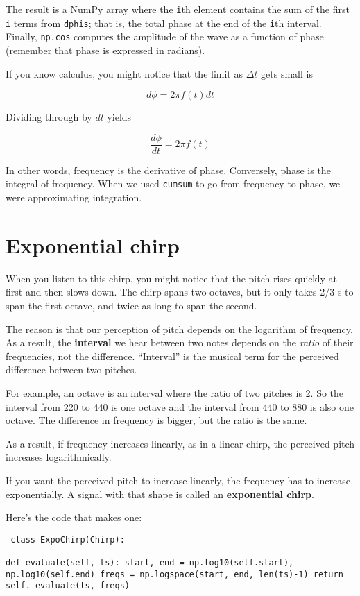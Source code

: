 \documentclass[12pt]{book} \usepackage[width=5.5in,height=8.5in, hmarginratio=3:2,vmarginratio=1:1]{geometry}
\begin{document}
The result is a NumPy array where the {\tt i}th element contains the sum of the first {\tt i} terms from {\tt dphis}; that is, the total phase at the end of the {\tt i}th interval. Finally, {\tt np.cos} computes the amplitude of the wave as a function of phase (remember that phase is expressed in radians). 

If you know calculus, you might notice that the limit as $\Delta t$ gets small is 

%
\[ d\phi = 2 \pi f(t) dt \] 

%
Dividing through by $dt$ yields 

%
\[ \frac{d\phi}{dt} = 2 \pi f(t) \] 

%
In other words, frequency is the derivative of phase. Conversely, phase is the integral of frequency. When we used {\tt cumsum} to go from frequency to phase, we were approximating integration. 

\section{Exponential chirp} 

When you listen to this chirp, you might notice that the pitch rises quickly at first and then slows down. The chirp spans two octaves, but it only takes 2/3 s to span the first octave, and twice as long to span the second. 

The reason is that our perception of pitch depends on the logarithm of frequency. As a result, the {\bf interval} we hear between two notes depends on the {\em ratio} of their frequencies, not the difference. ``Interval'' is the musical term for the perceived difference between two pitches. 

For example, an octave is an interval where the ratio of two pitches is 2. So the interval from 220 to 440 is one octave and the interval from 440 to 880 is also one octave. The difference in frequency is bigger, but the ratio is the same. 

As a result, if frequency increases linearly, as in a linear chirp, the perceived pitch increases logarithmically. 

If you want the perceived pitch to increase linearly, the frequency has to increase exponentially. A signal with that shape is called an {\bf exponential chirp}. 

Here's the code that makes one: 

\begin{verbatim} class ExpoChirp(Chirp): 

def evaluate(self, ts): start, end = np.log10(self.start), np.log10(self.end) freqs = np.logspace(start, end, len(ts)-1) return self._evaluate(ts, freqs) \end{verbatim} 
\end{document}
